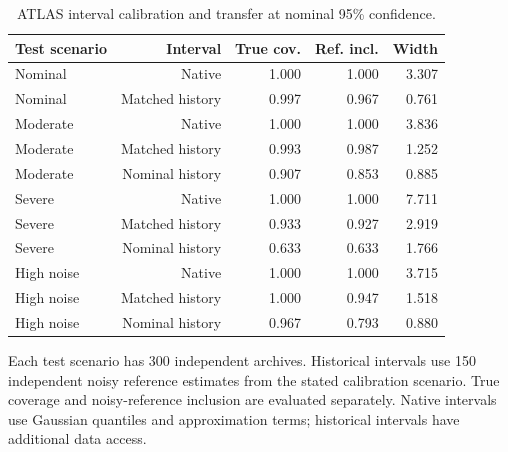 \begin{table}[htbp]
\centering\small
\setlength{\tabcolsep}{4pt}
\caption{ATLAS interval calibration and transfer at nominal 95\% confidence.}
\label{tab:b-calibration}
\begin{tabular}{lrrrr}
\toprule
Test scenario & Interval & True cov. & Ref. incl. & Width \\
\midrule
Nominal & Native & 1.000 & 1.000 & 3.307 \\
Nominal & Matched history & 0.997 & 0.967 & 0.761 \\
Moderate & Native & 1.000 & 1.000 & 3.836 \\
Moderate & Matched history & 0.993 & 0.987 & 1.252 \\
Moderate & Nominal history & 0.907 & 0.853 & 0.885 \\
Severe & Native & 1.000 & 1.000 & 7.711 \\
Severe & Matched history & 0.933 & 0.927 & 2.919 \\
Severe & Nominal history & 0.633 & 0.633 & 1.766 \\
High noise & Native & 1.000 & 1.000 & 3.715 \\
High noise & Matched history & 1.000 & 0.947 & 1.518 \\
High noise & Nominal history & 0.967 & 0.793 & 0.880 \\
\bottomrule
\end{tabular}
\par\smallskip\begin{minipage}{0.97\linewidth}\footnotesize Each test scenario has 300 independent archives. Historical intervals use 150 independent noisy reference estimates from the stated calibration scenario. True coverage and noisy-reference inclusion are evaluated separately. Native intervals use Gaussian quantiles and approximation terms; historical intervals have additional data access.\end{minipage}
\end{table}
